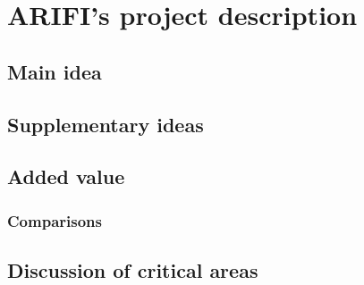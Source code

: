 \section{ARIFI's project description}
\subsection{Main idea}
\subsection{Supplementary ideas}
\subsection{Added value}
\subsubsection{Comparisons}	
\subsection{Discussion of critical areas}